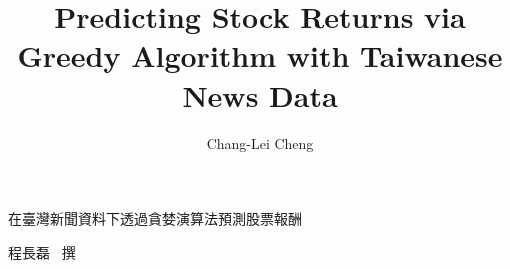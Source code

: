 \college{}{}
\title{Predicting Stock Returns via Greedy Algorithm with Taiwanese News Data}{在臺灣新聞資料下透過貪婪演算法預測股票報酬}
\author{Chang-Lei Cheng}{程長磊 \ 撰}
